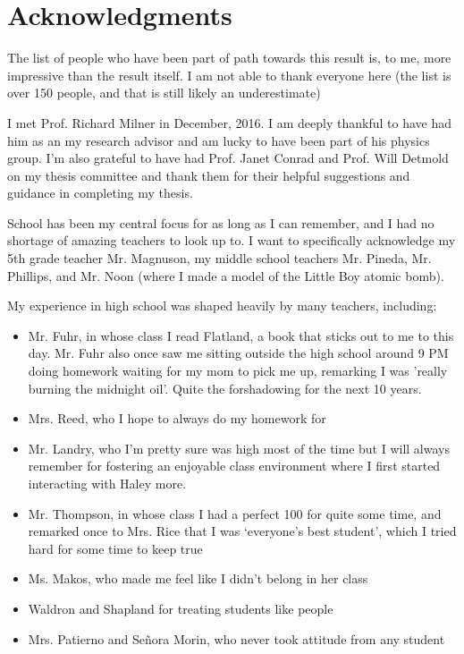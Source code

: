 \iffalse
\section*{Acknowledgments}
The list of people who have been part of path towards this result is, to me, more impressive than the result itself. I am not able to thank everyone here (the list is over 150 people, and that is still likely an underestimate)

I met Prof. Richard Milner in December, 2016. I am deeply thankful to have had him as an my research advisor and am lucky to have been part of his physics group. I'm also grateful to have had Prof. Janet Conrad and Prof. Will Detmold on my thesis committee and thank them for their helpful suggestions and guidance in completing my thesis.

School has been my central focus for as long as I can remember, and I had no shortage of amazing teachers to look up to. I want to specifically acknowledge my 5th grade teacher Mr. Magnuson, my middle school teachers Mr. Pineda, Mr. Phillips, and Mr. Noon (where I made a model of the Little Boy atomic bomb). 

My experience in high school was shaped heavily by many teachers, including:
\begin{itemize}
    \item Mr. Fuhr, in whose class I read Flatland, a book that sticks out to me to this day. Mr. Fuhr also once saw me sitting outside the high school around 9 PM doing homework waiting for my mom to pick me up, remarking I was 'really burning the midnight oil'. Quite the forshadowing for the next 10 years. 
    \item Mrs. Reed, who I hope to always do my homework for
    \item Mr. Landry, who I'm pretty sure was high most of the time but I will always remember for fostering an enjoyable class environment where I first started interacting with Haley more. 
    \item Mr. Thompson, in whose class I had a perfect 100 for quite some time, and remarked once to Mrs. Rice that I was `everyone's best student', which I tried hard for some time to keep true
    \item Ms. Makos, who made me feel like I didn't belong in her class
    \item Waldron and Shapland for treating students like people
    \item Mrs. Patierno and Se\~nora Morin, who never took attitude from any student    
\end{itemize} 

